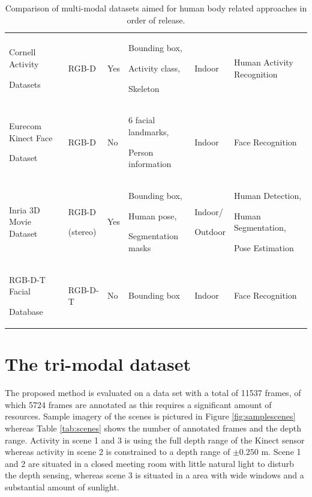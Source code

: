 \documentclass[10pt,twocolumn,letterpaper]{article}
\begin{document}
\begin{table}[htpb]
\begin{tabular}{p{4cm}p{1.5cm}p{0.7cm}p{3cm}p{1.2cm}p{4.1cm}}
Cornell Activity \par Datasets \cite{koppula2013learning}\strut	&	RGB-D	&	Yes	&	Bounding box, \par Activity class,\strut \par Skeleton\strut	&	Indoor	&	Human Activity Recognition \\
Eurecom Kinect Face \par Dataset \cite{huynh2013efficient}\strut	&	RGB-D	&	No	&	6 facial landmarks, \par Person information\strut	&	Indoor	&	Face Recognition \\
Inria 3D Movie Dataset \cite{alahari2013pose}	&	RGB-D \par(stereo)\strut 	&	Yes	&	Bounding box, \par Human pose,\strut \par Segmentation masks\strut	&	Indoor/ \par Outdoor\strut	&	Human Detection, \par Human Segmentation,\strut \par Pose Estimation\strut \\
RGB-D-T Facial \par Database \cite{nikisinsrgb}\strut &	RGB-D-T	&	No	&	Bounding box	&	Indoor	&	Face Recognition \\
\hline
\end{tabular}
\caption{Comparison of multi-modal datasets aimed for human body related approaches in order of release.}
\label{tab:datasets}
\end{table}
 
\section{The tri-modal dataset}
\label{sec:dataset}

The proposed method is evaluated on a data set with a total of 11537 frames, of which 5724 frames are annotated as this requires a significant amount of resources. Sample imagery of the scenes is pictured in Figure \ref{fig:samplescenes} whereas Table \ref{tab:scenes} shows the number of annotated frames and the depth range. Activity in scene 1 and 3 is using the full depth range of the Kinect sensor whereas activity in scene 2 is constrained to a depth range of $\pm 0.250$ m. Scene 1 and 2 are situated in a closed meeting room with little natural light to disturb the depth sensing, whereas scene 3 is situated in a area with wide windows and a substantial amount of sunlight.
\end{document}
